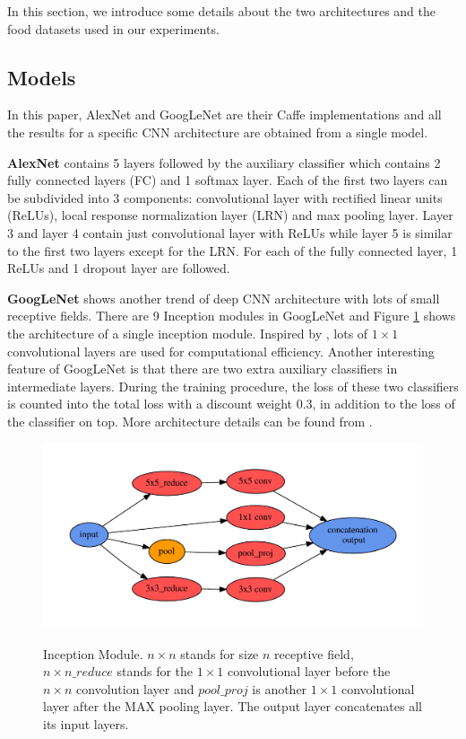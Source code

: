 In this section, we introduce some details about the two architectures and the food datasets used in our experiments.
\subsection{Models}
In this paper, AlexNet and GoogLeNet are their Caffe \cite{jia2014caffe} implementations and all the results for a specific CNN architecture are obtained from a single model.

\textbf{AlexNet}
contains 5 layers followed by the auxiliary classifier which contains 2 fully connected layers (FC) and 1 softmax layer. Each of the first two layers can be subdivided into 3 components: convolutional layer with rectified linear units (ReLUs), local response normalization layer (LRN) and max pooling layer. Layer 3 and layer 4 contain just convolutional layer with ReLUs while layer 5 is similar to the first two layers except for the LRN. For each of the fully connected layer, 1 ReLUs and 1 dropout \cite{srivastava2014dropout} layer are followed.

\textbf{GoogLeNet}
shows another trend of deep CNN architecture with lots of small receptive fields. There are 9 Inception modules in GoogLeNet and Figure \ref{incept} shows the architecture of a single inception module. Inspired by \cite{linNiN}, lots of $1\times 1$ convolutional layers are used for computational efficiency. Another interesting feature of GoogLeNet is that there are two extra auxiliary classifiers in intermediate layers. During the training procedure, the loss of these two classifiers is counted into the total loss with a discount weight 0.3, in addition to the loss of the classifier on top. More architecture details can be found from \cite{szegedy2014going}.
\begin{figure}
	\centering
	\includegraphics[scale=.7]{cnn/fig/inception.pdf}\\
	\caption{Inception Module. $n\times n$ stands for size $n$ receptive field, $n\times n\_reduce$ stands for the $1\times 1$ convolutional layer before the $n\times n$ convolution layer and $pool\_proj$ is another $1\times 1$ convolutional layer after the MAX pooling layer. The output layer concatenates all its input layers.}\label{incept}
\end{figure}

